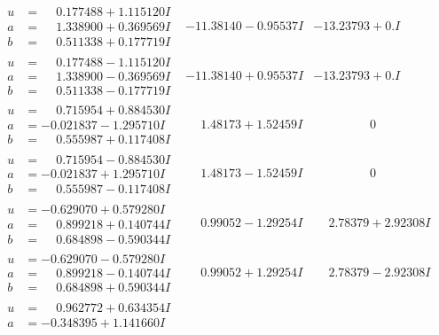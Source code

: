 \documentclass[1p]{elsarticle_modified}
\theoremstyle{definition}
\begin{document}
$$\begin{array}{c|c|c}
\begin{aligned}
u &= \phantom{-}0.177488 + 1.115120 I \\
a &= \phantom{-}1.338900 + 0.369569 I \\
b &= \phantom{-}0.511338 + 0.177719 I\end{aligned}
 & -11.38140 - 0.95537 I & -13.23793 + 0. I\phantom{ +0.000000I} \\ \hline\begin{aligned}
u &= \phantom{-}0.177488 - 1.115120 I \\
a &= \phantom{-}1.338900 - 0.369569 I \\
b &= \phantom{-}0.511338 - 0.177719 I\end{aligned}
 & -11.38140 + 0.95537 I & -13.23793 + 0. I\phantom{ +0.000000I} \\ \hline\begin{aligned}
u &= \phantom{-}0.715954 + 0.884530 I \\
a &= -0.021837 - 1.295710 I \\
b &= \phantom{-}0.555987 + 0.117408 I\end{aligned}
 & \phantom{-}1.48173 + 1.52459 I & \phantom{-0.000000 } 0 \\ \hline\begin{aligned}
u &= \phantom{-}0.715954 - 0.884530 I \\
a &= -0.021837 + 1.295710 I \\
b &= \phantom{-}0.555987 - 0.117408 I\end{aligned}
 & \phantom{-}1.48173 - 1.52459 I & \phantom{-0.000000 } 0 \\ \hline\begin{aligned}
u &= -0.629070 + 0.579280 I \\
a &= \phantom{-}0.899218 + 0.140744 I \\
b &= \phantom{-}0.684898 - 0.590344 I\end{aligned}
 & \phantom{-}0.99052 - 1.29254 I & \phantom{-}2.78379 + 2.92308 I \\ \hline\begin{aligned}
u &= -0.629070 - 0.579280 I \\
a &= \phantom{-}0.899218 - 0.140744 I \\
b &= \phantom{-}0.684898 + 0.590344 I\end{aligned}
 & \phantom{-}0.99052 + 1.29254 I & \phantom{-}2.78379 - 2.92308 I \\ \hline\begin{aligned}
u &= \phantom{-}0.962772 + 0.634354 I \\
a &= -0.348395 + 1.141660 I \\

\end{aligned}
\end{array}$$
\end{document}
